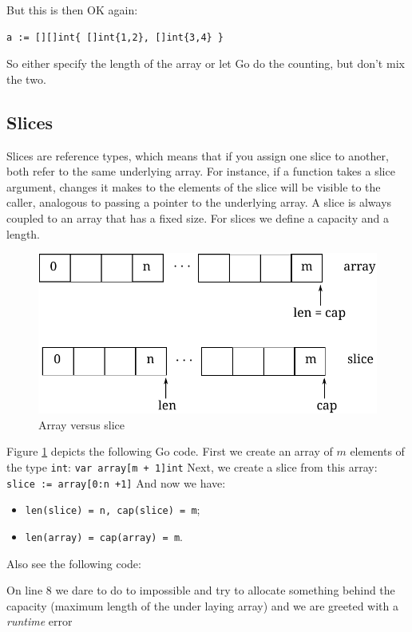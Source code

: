 But this is then OK again:
\begin{lstlisting}
a := [][]int{ []int{1,2}, []int{3,4} }
\end{lstlisting}  
So either specify the length of the array or let Go do the counting, but
don't mix the two.

\subsection{Slices}
Slices are reference types, which means that if you assign one slice to
another, both refer to the same underlying array. For instance, if a
function takes a slice argument, changes it makes to the elements of the
slice will be visible to the caller, analogous to passing a pointer to
the underlying array. A slice is always coupled to an array that has
a fixed size. For slices we define a capacity and a length.

\begin{figure}[!bh]
\caption{Array versus slice}
\label{fig:array-vs-slice}
\begin{center}
\includegraphics[scale=0.65]{fig/array-vs-slice.pdf}
\end{center}
\end{figure}
Figure \ref{fig:array-vs-slice} depicts the following Go code.
First we create an array of $m$ elements of the type \lstinline{int}:
\lstinline{var array[m + 1]int}\newline
Next, we create a slice from this array: 
\lstinline{slice := array[0:n +1]}\newline
And now we have:
\begin{itemize}
\item{\lstinline{len(slice) = n, cap(slice) = m};}
\item{\lstinline{len(array) = cap(array) = m}.}
\end{itemize}
Also see the following code:

On line 8 we dare to do to impossible and try to allocate something
behind the capacity (maximum length of the under laying array) and
we are greeted with a \emph{runtime} error 

